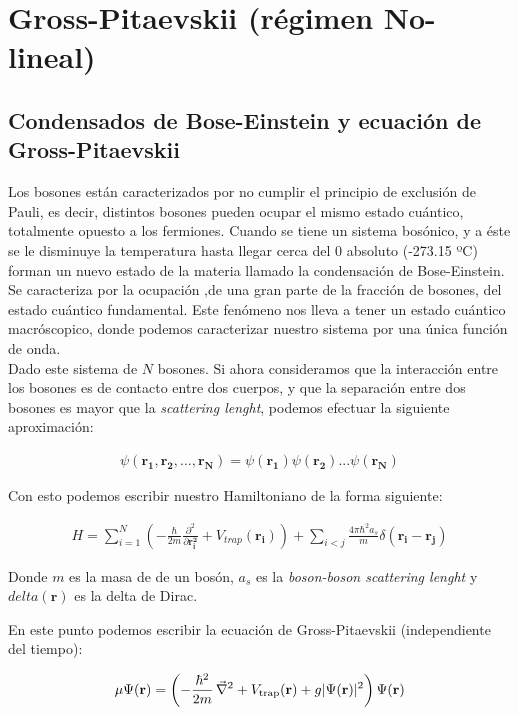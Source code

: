 \section{Gross-Pitaevskii (r\'egimen No-lineal)}

\subsection{Condensados de Bose-Einstein y ecuaci\'on de Gross-Pitaevskii}
Los bosones est\'an caracterizados por no cumplir el principio de exclusi\'on de Pauli, es decir, distintos bosones pueden ocupar el mismo estado cu\'antico, totalmente opuesto a los fermiones. Cuando se tiene un sistema bos\'onico, y a \'este se le disminuye la temperatura hasta llegar cerca del 0 absoluto (-273.15 ºC) forman un nuevo estado de la materia llamado la condensaci\'on de Bose-Einstein. Se caracteriza por la ocupaci\'on ,de una gran parte de la fracci\'on de bosones, del estado cu\'antico fundamental. Este fen\'omeno nos lleva a tener un estado cu\'antico macr\'oscopico, donde podemos caracterizar nuestro sistema por una \'unica funci\'on de onda.
\\

Dado este sistema de $N$ bosones. Si ahora consideramos que la interacci\'on entre los bosones es de contacto entre dos cuerpos, y que la separaci\'on entre dos bosones es mayor que la \textit{scattering lenght}, podemos efectuar la siguiente aproximaci\'on:
 
\begin{align}
\psi(\mathbf{r_1,r_2,...,r_N})=\psi(\mathbf{r_1})\psi(\mathbf{r_2})...\psi(\mathbf{r_N})
\label{eq:aprox}
\end{align}

Con esto podemos escribir nuestro Hamiltoniano de la forma siguiente:

\begin{align}
H=\sum_{i=1}^{N}(-\frac{\hbar}{2m}\frac{\partial^2}{\partial\mathbf{r_i^2}}+V_{trap}(\mathbf{r_i}))+\sum_{i<j}\frac{4\pi \hbar^2 a_s}{m}
\delta(\mathbf{r_i-r_j})
\label{eq:hamGP}
\end{align}

Donde $m$ es la masa de de un bos\'on, $a_s$ es la \textit{boson-boson scattering lenght} y $delta(\mathbf{r})$ es la delta de Dirac.

En este punto podemos escribir la ecuaci\'on de Gross-Pitaevskii (independiente del tiempo):

\begin{align}
 \mu
\Psi(\mathbf{r}) =\left(-\frac{\hbar^2}{2m} \,\vec{\nabla}^2+V_{\rm trap}(\mathbf{r})+g|\Psi(\mathbf{r})|^2 
\right)\Psi(\mathbf{r})
\label{eq:GP}
\end{align}

